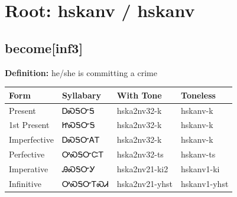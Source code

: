 \documentclass{article}%
\begin{document}
%
\normalsize%
\section*{Root: hskanv / hskanv}%
\subsection*{become[inf3]}%
\textbf{Definition: }%
he/she is committing a crime%
\\[0.5em]%
\begin{tabular}{|l|l|l|l|}%
\hline%
\textbf{Form}&\textbf{Syllabary}&\textbf{With Tone}&\textbf{Toneless}\\%
\hline%
Present&ᎠᏍᎦᏅᎦ&hska2nv32{-}k&hskanv{-}k\\%
1st Present&ᏥᏍᎦᏅᎦ&hska2nv32{-}k&hskanv{-}k\\%
Imperfective&ᎠᏍᎦᏅᎪᎢ&hska2nv32{-}k&hskanv{-}k\\%
Perfective&ᎤᏍᎦᏅᏨᎢ&hska2nv32{-}ts&hskanv{-}ts\\%
Imperative&ᎯᏍᎦᏅᎩ&hska2nv21{-}ki2&hskanv1{-}ki\\%
Infinitive&ᎤᏍᎦᏅᎢᏍᏗ&hska2nv21{-}yhst&hskanv1{-}yhst\\%
\hline%
\end{tabular}%
\\[1em]%
\end{document}
